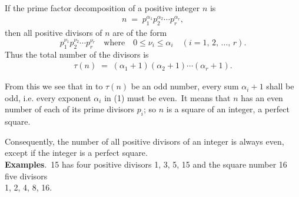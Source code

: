 \documentclass[12pt]{article}
\theoremstyle{definition}
\begin{document}
If the prime factor decomposition of a positive integer $n$ is
\begin{align}
n \;=\; p_1^{\alpha_1}p_2^{\alpha_2}\cdots p_r^{\alpha_r},
\end{align}
then all positive divisors of $n$ are of the form
$$
p_1^{\nu_1}p_2^{\nu_2}\cdots p_r^{\nu_r} \quad\mbox{where}\quad 0 \le \nu_i \le \alpha_i \quad(i = 1,\,2,\,\ldots,\,r).
$$
Thus the total number of the divisors is
\begin{align}
\tau(n) \;=\; (\alpha_1\!+\!1)(\alpha_2\!+\!1)\cdots(\alpha_r\!+\!1).
\end{align}


From this we see that in  to $\tau(n)$ be an odd number, every sum $\alpha_i\!+\!1$ shall be odd, i.e. every exponent $\alpha_i$ in (1) must be even.\, It means that $n$ has an even number of each of its prime divisors $p_i$; so $n$ is a square of an integer, a perfect square.

Consequently, the number of all positive divisors of an integer is always even, except if the integer is a perfect square.\\

\textbf{Examples}.\, 15 has four positive divisors 1, 3, 5, 15 and the square number 16 five divisors\\ 1, 2, 4, 8, 16.



\end{document}
